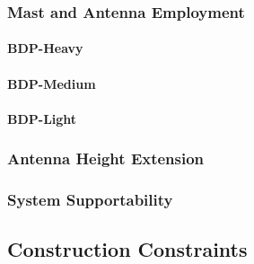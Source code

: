 \subsubsection{Mast and Antenna Employment}
\label{loc:sssec_DesignDefencesMast}


\paragraph{BDP-Heavy}
\label{loc:para_MastHeavy}


\paragraph{BDP-Medium}
\label{loc:para_MastMedium}


\paragraph{BDP-Light}
\label{loc:para_MastLight}



\subsubsection{Antenna Height Extension}
\label{loc:sssec_AntennaExt}



\subsubsection{System Supportability}
\label{loc:sssec_Support}



\KNEADSUBSECTIONNEWPAGE
\subsection{Construction Constraints}
\label{lab:ssec_ConstructionConstraints}

